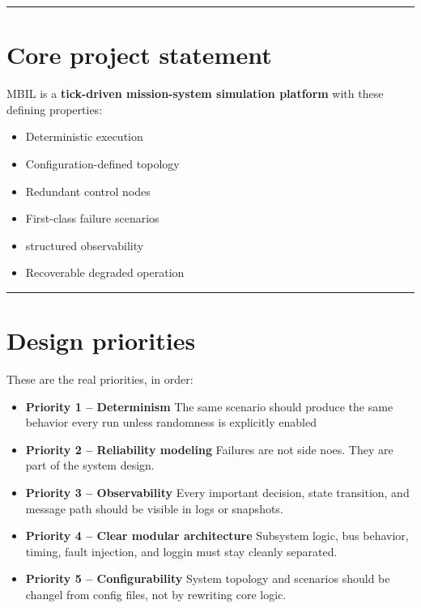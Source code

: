 \documentclass{report}
\begin{document}
\begin{center}
\rule{0.9\textwidth}{1pt}
\end{center}

\section{Core project statement}
MBIL is a \textbf{tick-driven mission-system simulation platform} with these defining properties:
\begin{itemize}
   \item Deterministic execution
   \item Configuration-defined topology
   \item Redundant control nodes
   \item First-class failure scenarios
   \item structured observability 
   \item Recoverable degraded operation 
\end{itemize}

\begin{center}
\rule{0.9\textwidth}{1pt}
\end{center}
\section{Design priorities}
These are the real priorities, in order:
\begin{itemize}
   \item[] \textbf{Priority 1 -- Determinism}
\vspace{\baselineskip}The same scenario should produce the same behavior every run unless randomness is explicitly enabled 
   \item[] \textbf{Priority 2 -- Reliability modeling}
\vspace{\baselineskip}Failures are not side noes.  They are part of the system design. 
   \item[] \textbf{Priority 3 -- Observability}
\vspace{\baselineskip}Every important decision, state transition, and message path should be visible in logs or snapshots. 
   \item[] \textbf{Priority 4 -- Clear modular architecture}
\vspace{\baselineskip}Subsystem logic, bus behavior, timing, fault injection, and loggin must stay cleanly separated. 
   \item[] \textbf{Priority 5 -- Configurability}
\vspace{\baselineskip}System topology and scenarios should be changel from config files, not by rewriting core logic. 
\end{itemize}
\end{document}
